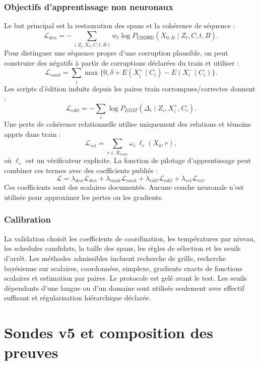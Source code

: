 \documentclass[11pt,a4paper,oneside]{report}
\newcommand{\Coord}{\mathsf{COORD}}
\begin{document}
\section{Objectifs d'apprentissage non neuronaux}
Le but principal est la restauration des spans et la cohérence de séquence :
\[
\mathcal L_{den}=-\sum_{(Z_t,X_0,C,t,B)}w_t\log P_{\Coord}(X_{0,B}\mid Z_t,C,t,B).
\]
Pour distinguer une séquence propre d'une corruption plausible, on peut construire des négatifs à partir de corruptions déclarées du train et utiliser :
\[
\mathcal L_{rank}=\sum_i\max\{0,\delta+E(X_i^+\mid C_i)-E(X_i^-\mid C_i)\}.
\]
Les scripts d'édition induits depuis les paires train corrompues/correctes donnent :
\[
\mathcal L_{edit}=-\sum_i\log P_{EDIT}(\Delta_i\mid Z_i,X_i^+,C_i).
\]
Une perte de cohérence relationnelle utilise uniquement des relations et témoins appris dans train :
\[
\mathcal L_{rel}=\sum_{r\in\mathcal R_{train}}\omega_r\,\ell_r(X_0,r),
\]
où $\ell_r$ est un vérificateur explicite. La fonction de pilotage d'apprentissage peut combiner ces termes avec des coefficients publiés :
\[
\mathcal L=\lambda_{den}\mathcal L_{den}+\lambda_{rank}\mathcal L_{rank}
+\lambda_{edit}\mathcal L_{edit}+\lambda_{rel}\mathcal L_{rel}.
\]
Ces coefficients sont des scalaires documentés. Aucune couche neuronale n'est utilisée pour approximer les pertes ou les gradients.

\section{Calibration}
La validation choisit les coefficients de coordination, les températures par niveau, les schedules candidats, la taille des spans, les règles de sélection et les seuils d'arrêt. Les méthodes admissibles incluent recherche de grille, recherche bayésienne sur scalaires, coordonnées, simplexe, gradients exacts de fonctions scalaires et estimation par paires. Le protocole est gelé avant le test. Les seuils dépendants d'une langue ou d'un domaine sont utilisés seulement avec effectif suffisant et régularisation hiérarchique déclarée.

\part{Sondes v5 et composition des preuves}
\end{document}

